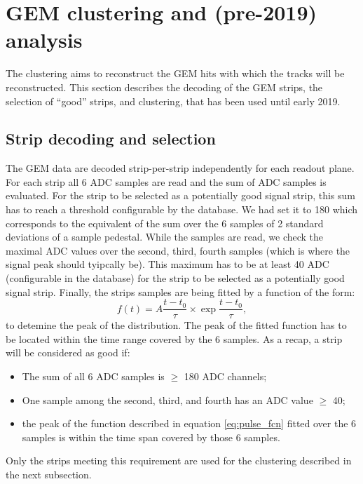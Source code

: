 \section{GEM clustering and (pre-2019) analysis}
\label{clustering}

The clustering aims to reconstruct the GEM hits with which the tracks will be reconstructed.
This section describes the decoding of the GEM strips, the selection of ``good'' strips, and clustering, that has been used until early 2019.

\subsection{Strip decoding and selection}
\label{strip_sel}

The GEM data are decoded strip-per-strip independently for each readout plane.
For each strip all 6 ADC samples are read and the sum of ADC samples is evaluated.
For the strip to be selected as a potentially good signal strip, this sum has to reach a threshold configurable by the database.
We had set it to 180 which corresponds to the equivalent of the sum over the 6 samples of 2 standard deviations of a sample pedestal.
While the samples are read, we check the maximal ADC values over the second, third, fourth samples (which is where the signal peak should tyipcally be). This maximum has to be at least 40 ADC (configurable in the database) for the strip to be selected as a potentially good signal strip.  
Finally, the strips samples are being fitted by a function of the form:
%
\begin{equation}
  f(t) = A \frac{t-t_0}{\tau} \times \exp{\frac{t-t_0}{\tau}},
  \label{eq:pulse_fcn}
\end{equation}
%
to detemine the peak of the distribution. The peak of the fitted function has to be located within the time range covered by the 6 samples.
As a recap, a strip will be considered as good if:
%
\begin{itemize}
\item{The sum of all 6 ADC samples is $\geq$ 180 ADC channels;}
\item{One sample among the second, third, and fourth has an ADC value $\geq$ 40;}
\item{the peak of the function described in equation \ref{eq:pulse_fcn} fitted over the 6 samples is within the time span covered by those 6 samples.}
\end{itemize}
%
Only the strips meeting this requirement are used for the clustering described in the next subsection.

